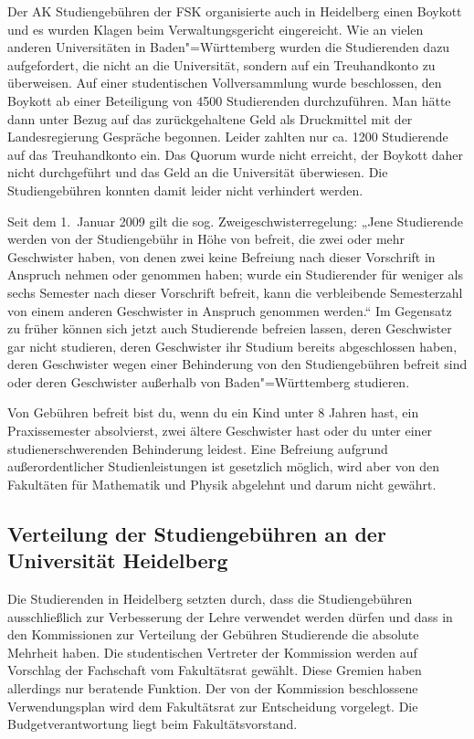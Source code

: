 Der AK Studiengebühren der \gls{FSK} organisierte auch in Heidelberg einen Boykott und es
wurden Klagen beim Verwaltungsgericht eingereicht. Wie an vielen anderen
Universitäten in Baden"=Württemberg wurden die Studierenden dazu aufgefordert, die
 nicht an die Universität, sondern auf ein Treuhandkonto zu überweisen. Auf
einer studentischen Vollversammlung wurde beschlossen, den Boykott ab einer
Beteiligung von 4500 Studierenden durchzuführen. Man hätte dann unter Bezug auf das
zurückgehaltene Geld als Druckmittel mit der Landesregierung Gespräche begonnen.
Leider zahlten nur ca. 1200 Studierende auf das Treuhandkonto ein. Das Quorum wurde
nicht erreicht, der Boykott daher nicht durchgeführt und das Geld an die Universität
überwiesen. Die Studiengebühren konnten damit leider nicht verhindert werden.

Seit dem 1.\ Januar 2009 gilt die sog. Zweigeschwisterregelung: „Jene Studierende
werden von der Studiengebühr in Höhe von  befreit, die zwei oder mehr
Geschwister haben, von denen zwei keine Befreiung nach dieser Vorschrift in Anspruch
nehmen oder genommen haben; wurde ein Studierender für weniger als sechs Semester
nach dieser Vorschrift befreit, kann die verbleibende Semesterzahl von einem anderen
Geschwister in Anspruch genommen werden.“ Im Gegensatz zu früher können sich jetzt
auch Studierende befreien lassen, deren Geschwister gar nicht studieren, deren
Geschwister ihr Studium bereits abgeschlossen haben, deren Geschwister wegen einer
Behinderung von den Studiengebühren befreit sind oder deren Geschwister außerhalb
von Baden"=Württemberg studieren.

Von Gebühren befreit bist du, wenn du ein Kind unter 8 Jahren hast, ein Praxissemester absolvierst, zwei ältere Geschwister hast oder du unter einer studienerschwerenden Behinderung leidest. Eine Befreiung aufgrund außerordentlicher Studienleistungen ist gesetzlich möglich, wird aber von den Fakultäten für Mathematik und Physik abgelehnt und darum nicht gewährt.



\subsection*{Verteilung der Studiengebühren an der Universität Heidelberg}

Die Studierenden in Heidelberg setzten durch, dass die Studiengebühren ausschließlich
zur Verbesserung der Lehre verwendet werden dürfen und dass in den Kommissionen zur
Verteilung der Gebühren Studierende die absolute Mehrheit haben. Die studentischen
Vertreter der Kommission werden auf Vorschlag der Fachschaft vom Fakultätsrat
gewählt. Diese Gremien haben allerdings nur beratende Funktion. Der von der
Kommission beschlossene Verwendungsplan wird dem Fakultätsrat zur Entscheidung
vorgelegt. Die Budgetverantwortung liegt beim Fakultätsvorstand.


